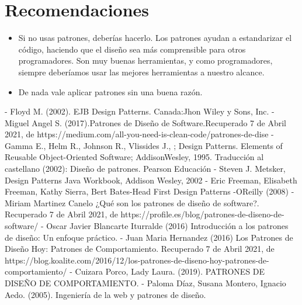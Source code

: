 \documentclass[12pt,letterpaper]{article}
\begin{document}
\section{Recomendaciones}
\begin{itemize}
    \item Si no usas patrones, deberías hacerlo. Los patrones ayudan a estandarizar el código, haciendo que el diseño sea más comprensible para otros programadores. Son muy buenas herramientas, y como programadores, siempre deberíamos usar las mejores herramientas a nuestro alcance. 
    \item De nada vale aplicar patrones sin una buena razón. 
    
\end{itemize}
	

\begin{thebibliography}{XXX0000}
\bibitem - Floyd M. (2002). EJB Design Patterns. Canada:Jhon Wiley y Sons, Inc. 
\bibitem - Miguel Angel S. (2017).Patrones de Diseño de Software.Recuperado 7 de Abril 2021, de https://medium.com/all-you-need-is-clean-code/patrones-de-dise%
\bibitem - Gamma E., Helm R., Johnson R., Vlissides J., ; Design Patterns.
Elements of Reusable Object-Oriented Software; AddisonWesley, 1995. Traducción al castellano (2002): Diseño de
patrones. Pearson Educación
\bibitem - Steven J. Metsker, Design Patterns Java Workbook, Addison
Wesley, 2002
\bibitem - Eric Freeman, Elisabeth Freeman, Kathy Sierra, Bert Bates-Head First Design Patterns -OReilly (2008) 
\bibitem - Miriam Martinez Canelo ¿Qué son los patrones de diseño de software?. Recuperado 7 de Abril 2021, de https://profile.es/blog/patrones-de-diseno-de-software/
\bibitem - Oscar Javier Blancarte Iturralde (2016) Introducción a los patrones de diseño: Un enfoque práctico.
\bibitem - Juan Maria Hernandez (2016) Los Patrones de Diseño Hoy: Patrones de Comportamiento. Recuperado 7 de Abril 2021, de https://blog.koalite.com/2016/12/los-patrones-de-diseno-hoy-patrones-de-comportamiento/
\bibitem - Cuizara Porco, Lady Laura. (2019). PATRONES DE DISEÑO DE COMPORTAMIENTO. 
\bibitem - Paloma Díaz, Susana Montero, Ignacio Aedo. (2005). Ingeniería de la web y patrones de diseño.
\end{thebibliography}
\end{document}

